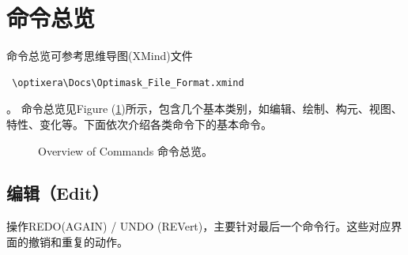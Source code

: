 \section{命令总览} \label{SectCmdCtgr} %
命令总览可参考思维导图(XMind)文件
\begin{verbatim} \optixera\Docs\Optimask_File_Format.xmind \end{verbatim}。
命令总览见Figure (\ref{FigCmdOverview})所示，包含几个基本类别，如编辑、绘制、构元、视图、特性、变化等。下面依次介绍各类命令下的基本命令。
\begin{figure}[htb!p] %
	\centering
	\hfill
	\caption{Overview of Commands 命令总览。}
	\label{FigCmdOverview}
\end{figure}

\subsection{编辑（Edit）} \label{SectCmdEdit}
操作REDO(AGAIN) / UNDO (REVert)，主要针对最后一个命令行。这些对应界面的撤销和重复的动作。

